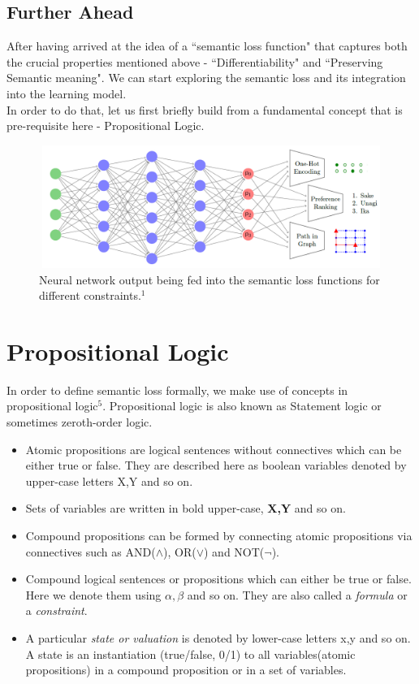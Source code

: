 \documentclass[12pt]{article}
\begin{document}
\subsection{Further Ahead}
After having arrived at the idea of a ``semantic loss function" that captures both the crucial properties mentioned above - ``Differentiability" and ``Preserving Semantic meaning". We can start exploring the semantic loss and its integration into the learning model.\\
In order to do that, let us first briefly build from a fundamental concept that is pre-requisite here - Propositional Logic.

\begin{figure}[htp]
    \centering
    \includegraphics[width=12cm, height=4cm]{image1}
    \caption{Neural network output being fed into the semantic loss functions for different constraints.$^1$}
    \label{image1}
\end{figure}


\section{Propositional Logic}

In order to define semantic loss formally, we make use of concepts in propositional logic$^5$. Propositional logic is also known as Statement logic or sometimes zeroth-order logic. 
\begin{itemize}
    \item Atomic propositions are logical sentences without connectives which can be either true or false. They are described here as boolean variables denoted by upper-case letters X,Y and so on.
    \item Sets of variables are written in bold upper-case, \textbf{X,Y} and so on.
    \item Compound propositions can be formed by connecting atomic propositions via connectives such as AND($\wedge$), OR($\vee$) and NOT($\neg$).
    \item Compound logical sentences or propositions which can either be true or false. Here we denote them using $\alpha, \beta$ and so on. They are also called a \textit{formula} or a \textit{constraint}.
    \item A particular \textit{state or valuation} is denoted by lower-case letters x,y and so on. A state is an instantiation (true/false, 0/1) to all variables(atomic propositions) in a compound proposition or in a set of variables. 
\end{itemize}
\end{document}
